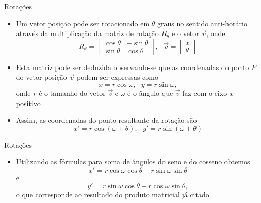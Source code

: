 \begin{frame}[fragile]{Rotações}

    \begin{itemize}
        \item Um vetor posição pode ser rotacionado em $\theta$ graus no sentido anti-horário
            através da multiplicação da matriz de rotação $R_\theta$ e o vetor $\vec{v}$, onde
        \[
            R_\theta = \begin{bmatrix} \cos \theta & -\sin \theta \\ \sin \theta & \cos \theta
                \end{bmatrix}, \, \, \, \, \vec{v} = \begin{bmatrix} x \\ y \end{bmatrix}
        \]

        \item Esta matriz pode ser deduzida observando-se que as coordenadas do ponto $P$ do
            vetor posição $\vec{v}$ podem ser expressas como 
            \[
                x = r\cos \omega, \, \, \, \, y = r\sin \omega, 
            \]
            onde $r$ é o tamanho do vetor $\vec{v}$ e $\omega$ é o ângulo que $\vec{v}$ faz com
            o eixo-$x$ positivo

        \item Assim, as coordenadas do ponto resultante da rotação são 
        \[
            x' = r\cos (\omega + \theta), \, \, \, \, y' = r\sin (\omega + \theta)
        \]

    \end{itemize}

\end{frame}

\begin{frame}[fragile]{Rotações}

    \begin{itemize}
        \item Utilizando as fórmulas para soma de ângulos do seno e do cosseno obtemos
        \[
            x' = r\cos \omega\cos \theta - r\sin \omega\sin \theta
        \] e
        \[
            y' = r\sin \omega\cos \theta + r\cos \omega\sin \theta,
        \]
        o que corresponde ao resultado do produto matricial já citado 

    \end{itemize}

\end{frame}

